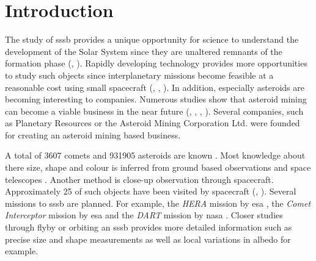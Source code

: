 \section{Introduction} \label{sec:introduction}


The study of \gls{sssb} provides a unique opportunity for science to understand the development of the Solar System since they are unaltered remnants of the formation phase (\cite{walsh2018rubble}, \cite{a2017comets}). Rapidly developing technology provides more opportunities to study such objects since interplanetary missions become feasible at a reasonable cost using small spacecraft (\cite{poghosyan2017cubesat}, \cite{andrews2019asteroid}, \cite{snodgrass2019europeanCI}).
In addition, especially asteroids are becoming interesting to companies. Numerous studies show that asteroid mining can become a viable business in the near future (\cite{andrews2015defining}, \cite{busch2004profitable}, \cite{weinzierl2018EconomicFrontier}, \cite{pittman2017deep}). Several companies, such as Planetary Resources \cite{lewicki2013planetary} or the Asteroid Mining Corporation Ltd. \cite{asteroidminingcorporation} were founded for creating an asteroid mining based business.

A total of \SI{3607}{} comets and \SI{931905}{} asteroids are known \cite{nasaSBD_count}. Most knowledge about there size, shape and colour is inferred from ground based observations and space telescopes \cite{bowles2018castaway}. Another method is close-up observation through spacecraft. Approximately \SI{25}{} of such objects have been visited by spacecraft (\cite{wikipediaVisitedList}, \cite{nasaSBD_missions}). Several missions to \gls{sssb} are planned. For example, the \textit{HERA} mission by \gls{esa} \cite{hera}, the \textit{Comet Interceptor} mission by \gls{esa} \cite{snodgrass2019europeanCI} and the \textit{DART} mission by \gls{nasa} \cite{talbert_2017DART}. Closer studies through flyby or orbiting an \gls{sssb} provides more detailed information such as precise size and shape measurements as well as local variations in albedo for example.

